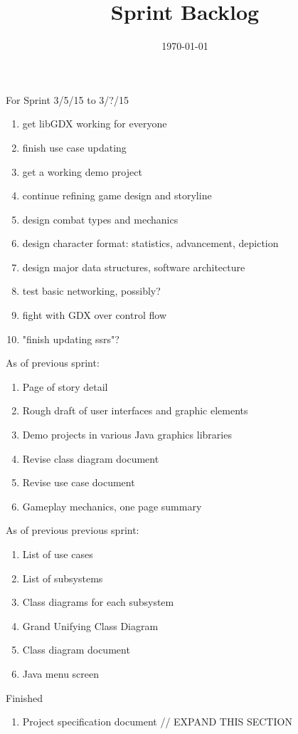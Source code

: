 \documentclass[12pt]{article}
\title{Sprint Backlog}
\date{\today}
\begin{document}
\maketitle

\begin{section}{For Sprint 3/5/15 to 3/?/15}
\begin{enumerate}

\item get libGDX working for everyone
\item finish use case updating
\item get a working demo project

\item continue refining game design and storyline
\item design combat types and mechanics
\item design character format: statistics, advancement, depiction
\item design major data structures, software architecture

\item test basic networking, possibly?
\item fight with GDX over control flow
\item "finish updating ssrs"?


\end{enumerate}
\end{section}


\begin{section}{As of previous sprint:}
\begin{enumerate}
\item Page of story detail
\item Rough draft of user interfaces and graphic elements
\item Demo projects in various Java graphics libraries
\item Revise class diagram document
\item Revise use case document
\item Gameplay mechanics, one page summary
\end{enumerate}
\end{section}

\begin{section}{As of previous previous sprint:}
\begin{enumerate}
\item List of use cases
\item List of subsystems
\item Class diagrams for each subsystem
\item Grand Unifying Class Diagram
\item Class diagram document
\item Java menu screen
\end{enumerate}
\end{section}

\begin{section}{Finished}
\begin{enumerate}
\item Project specification document
// EXPAND THIS SECTION
\end{enumerate}
\end{section}
\end{document}

